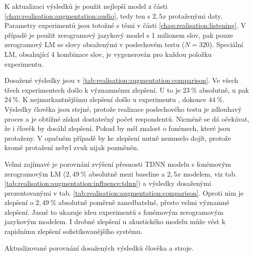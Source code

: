 K aktualizaci výsledků je použit nejlepší model z části \ref{chap:realisation:augmentation:audio}, tedy ten s $2,5x$ protaženými daty. Parametry experimentů jsou totožné s těmi v části \ref{chap:realisation:listening}. V případě  je použit zerogramový jazykový model s 1 milionem slov,  pak pouze zerogramový LM se slovy obsaženými v poslechovém testu ($N = 320$). Speciální LM, obsahující 4 kombinace slov, je vygenerován pro každou položku  experimentu.

Dosažené výsledky jsou v \ref{tab:realisation:augmentation:comparison}. Ve všech třech experimentech došlo k významnému zlepšení. U  to je $23\ \%$ absolutně, u  pak $24\ \%$. K nejmarkantnějšímu zlepšení došlo u experimentu , dokonce $44\ \%$. Výsledky člověka jsou stejné, protože realizace poslechového testu je zdlouhavý proces a je obtížné získat dostatečný počet respondentů. Nicméně se dá očekávat, že i člověk by dosáhl zlepšení. Pokud by měl znalost o fonémech, které jsou protaženy. V opačném případě by ke zlepšení nutně nemuselo dojít, protože kromě protažení nebyl zvuk nijak pozměněn.

Velmi zajímavé je porovnání zvýšení přesnosti TDNN modelu s fonémovým zerogramovým LM ($2,49\ \%$ absolutně mezi baseline a $2,5x$ modelem, viz tab. \ref{tab:realisation:augmentation:influence:tdnn}) a výsledky dosaženými prezentovanými v tab. \ref{tab:realisation:augmentation:comparison}. Oproti nim je zlepšení o $2,49\ \%$ absolutně poměrně zanedbatelné, přesto velmi významné zlepšení. Jasně to ukazuje ideu experimentů s fonémovým zerogramovým jazykovým modelem. I drobné zlepšení u akustického modelu může vést k rapidnímu zlepšení sofistikovanějšího systému.

\begin{table}[htpb]
  \centering
  \def\arraystretch{1.5}
  \caption{Aktualizované porovnání dosažených výsledků člověka a stroje.}
  \label{tab:realisation:augmentation:comparison}
\end{table}

